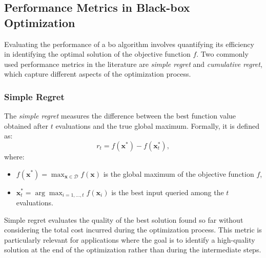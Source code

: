 
\subsection{Performance Metrics in Black-box Optimization}
\label{background:performance_metrics}
Evaluating the performance of a \acf{bo} algorithm involves quantifying its efficiency in identifying the optimal solution of the objective function \( f \). Two commonly used performance metrics in the literature are \emph{simple regret} and \emph{cumulative regret}, which capture different aspects of the optimization process.

\subsubsection{Simple Regret}
The \emph{simple regret} measures the difference between the best function value obtained after \( t \) evaluations and the true global maximum. Formally, it is defined as:
\[
r_t = f(\mathbf{x}^*) - f(\mathbf{x}_t^*),
\]
where:
\begin{itemize}
    \item \( f(\mathbf{x}^*) = \max_{\mathbf{x} \in \mathcal{D}} f(\mathbf{x}) \) is the global maximum of the objective function \( f \),
    \item \( \mathbf{x}_t^* = \arg \max_{i=1,\dots,t} f(\mathbf{x}_i) \) is the best input queried among the \( t \) evaluations.
\end{itemize}

Simple regret evaluates the quality of the best solution found so far without considering the total cost incurred during the optimization process. This metric is particularly relevant for applications where the goal is to identify a high-quality solution at the end of the optimization rather than during the intermediate steps.

